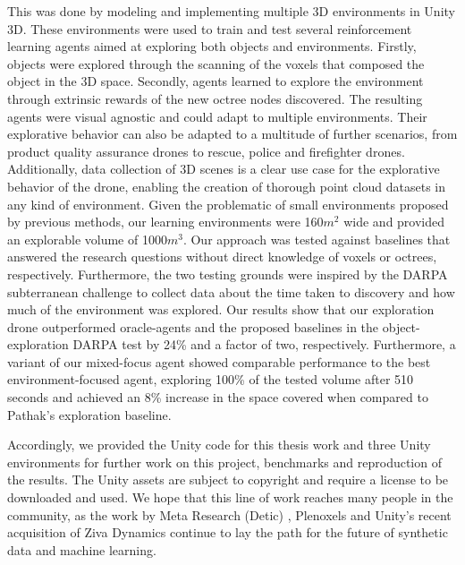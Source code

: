 This was done by modeling and implementing multiple 3D environments in Unity 3D.
These environments were used to train and test several reinforcement learning agents aimed at exploring both objects and environments.
Firstly, objects were explored through the scanning of the voxels that composed the object in the 3D space. 
Secondly, agents learned to explore the environment through extrinsic rewards of the new octree nodes discovered. The resulting agents were visual agnostic and could adapt to multiple environments. Their explorative behavior can also be adapted to a multitude of further scenarios, from product quality assurance drones to rescue, police and firefighter drones. 
Additionally, data collection of 3D scenes is a clear use case for the explorative behavior of the drone, enabling the creation of thorough point cloud datasets in any kind of environment. Given the problematic of small environments proposed by previous methods, our learning environments were 160$m^2$ wide and provided an explorable volume of 1000$m^3$. Our approach was tested against baselines that answered the research questions without direct knowledge of voxels or octrees, respectively. Furthermore, the two testing grounds were inspired by the DARPA subterranean challenge to collect data about the time taken to discovery and how much of the environment was explored. Our results show that our exploration drone outperformed oracle-agents and the proposed baselines in the object-exploration DARPA test by 24\% and a factor of two, respectively. Furthermore, a variant of our mixed-focus agent showed comparable performance to the best environment-focused agent, exploring 100\% of the tested volume after 510 seconds and achieved an 8\% increase in the space covered when compared to Pathak's exploration baseline.

Accordingly, we provided the Unity code for this thesis work and three Unity environments for further work on this project, benchmarks and reproduction of the results. The Unity assets are subject to copyright and require a license to be downloaded and used. We hope that this line of work reaches many people in the community, as the work by Meta Research (Detic) \cite{detic2022}, Plenoxels \cite{yu2021plenoxels} and Unity's recent acquisition of Ziva Dynamics \cite{unityziva2022dynamics} continue to lay the path for the future of synthetic data and machine learning.


